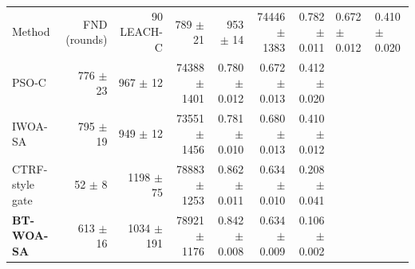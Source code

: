 \begin{tabular}{lrrrrrr}
\toprule
Method & FND (rounds) & 90 %
\midrule
LEACH-C & 789 $\pm$ 21 & 953 $\pm$ 14 & 74446 $\pm$ 1383 & 0.782 $\pm$ 0.011 & 0.672 $\pm$ 0.012 & 0.410 $\pm$ 0.020 \\
PSO-C & 776 $\pm$ 23 & 967 $\pm$ 12 & 74388 $\pm$ 1401 & 0.780 $\pm$ 0.012 & 0.672 $\pm$ 0.013 & 0.412 $\pm$ 0.020 \\
IWOA-SA & 795 $\pm$ 19 & 949 $\pm$ 12 & 73551 $\pm$ 1456 & 0.781 $\pm$ 0.010 & 0.680 $\pm$ 0.013 & 0.410 $\pm$ 0.012 \\
CTRF-style gate & 52 $\pm$ 8 & 1198 $\pm$ 75 & 78883 $\pm$ 1253 & 0.862 $\pm$ 0.011 & 0.634 $\pm$ 0.010 & 0.208 $\pm$ 0.041 \\
\textbf{BT-WOA-SA} & 613 $\pm$ 16 & 1034 $\pm$ 191 & 78921 $\pm$ 1176 & 0.842 $\pm$ 0.008 & 0.634 $\pm$ 0.009 & 0.106 $\pm$ 0.002 \\
\bottomrule
\end{tabular}